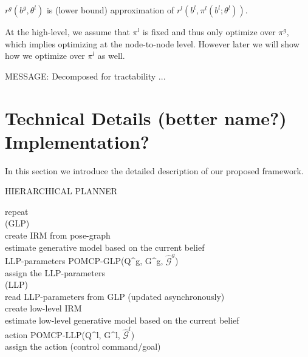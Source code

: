 \documentclass{article}
\begin{document}
$r^g(b^g, \theta^l)$ is (lower bound) approximation of $r^l(b^l, \pi^l(b^l; \theta^l))$.

At the high-level, we assume that $\pi^l$ is fixed and thus only optimize over $\pi^g$, which implies optimizing at the node-to-node level. However later we will show how we optimize over $\pi^l$ as well.

MESSAGE: Decomposed for tractability ...


\section{Technical Details (better name?) Implementation?}

In this section we introduce the detailed description of our proposed framework.

HIERARCHICAL PLANNER

repeat\\
    (GLP)\\
    create IRM from pose-graph\\
    estimate generative model based on the current belief\\
    LLP-parameters \gets POMCP-GLP(Q^g, G^g, $\hat{\mathcal{G}}^g$)\\
    assign the LLP-parameters\\
    
    (LLP)\\
    read LLP-parameters from GLP (updated asynchronously)\\
    create low-level IRM\\
    estimate low-level generative model based on the current belief\\
    action \gets POMCP-LLP(Q^l, G^l, $\hat{\mathcal{G}}^l$)\\
    assign the action (control command/goal)\\
\end{document}
